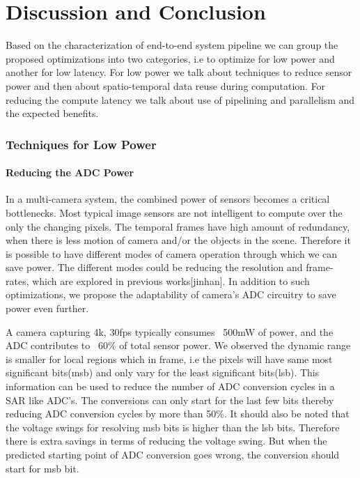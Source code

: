 \chapter{Discussion and Conclusion}

Based on the characterization of end-to-end system pipeline we can group the proposed optimizations into two categories, i.e to optimize for low power and another for low latency. For low power we talk about techniques to reduce sensor power and then about spatio-temporal data reuse during computation. For reducing the compute latency we talk about use of pipelining and parallelism and the expected benefits. 

\subsection{Techniques for Low Power}

\subsubsection{Reducing the ADC Power}
In a multi-camera system, the combined power of sensors becomes a critical bottlenecks. Most typical image sensors are not intelligent to compute over the only the changing pixels. The temporal frames have high amount of redundancy, when there is less motion of camera and/or the objects in the scene. Therefore it is possible to have different modes of camera operation through which we can save power. The different modes could be reducing the resolution and frame-rates, which are explored in previous works[jinhan]. In addition to such optimizations, we propose the adaptability of camera's ADC circuitry to save power even further. 

A camera capturing 4k, 30fps typically consumes ~500mW of power, and the ADC contributes to ~60\% of total sensor power. We observed the dynamic range is smaller for local regions which in frame, i.e the pixels will have same most significant bits(msb) and only vary for the least significant bits(lsb). This information can be used to reduce the number of ADC conversion cycles in a SAR like ADC's. The conversions can only start for the last few bits thereby reducing ADC conversion cycles by more than 50\%. It should also be noted that the voltage swings for resolving msb bits is higher than the lsb bits. Therefore there is extra savings in terms of reducing the voltage swing. But when the predicted starting point of ADC conversion goes wrong, the conversion should start for msb bit. 

